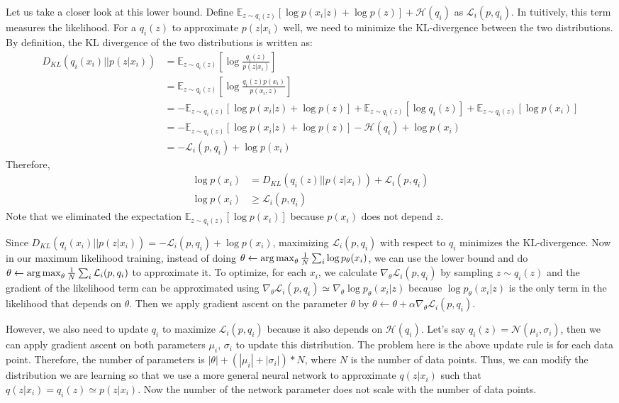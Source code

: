 Let us take a closer look at this lower bound. Define $\mathbb{E}_{z\sim q_i(z)}\left[\log p(x_i|z)+\log p(z)\right] + \mathcal{H}(q_i)$ as $\mathcal{L}_i(p,q_i)$. In tuitively, this term measures the likelihood. For a $q_i(z)$ to approximate $p(z|x_i)$ well, we need to minimize the KL-divergence between the two distributions. By definition, the KL divergence of the two distributions is written as:
\begin{align*}
    D_{KL}(q_i(x_i)||p(z|x_i))&=\mathbb{E}_{z\sim q_i(z)}\left[\log \frac{q_i(z)}{p(z|x_i)}\right]\\
    &=\mathbb{E}_{z\sim q_i(z)}\left[\log \frac{q_i(z)p(x_i)}{p(x_i,z)}\right]\\
    &= -\mathbb{E}_{z\sim q_i(z)}\left[\log p(x_i|z)+\log p(z)\right] + \mathbb{E}_{z\sim q_i(z)}\left[\log q_i(z)\right]+ \mathbb{E}_{z\sim q_i(z)}\left[\log p(x_i)\right]\\
    &= -\mathbb{E}_{z\sim q_i(z)}\left[\log p(x_i|z)+\log p(z)\right] -\mathcal{H}(q_i)+\log p(x_i)\\
    &=-\mathcal{L}_i(p,q_i) + \log p(x_i)
\end{align*}
Therefore,
\begin{align*}
    \log p(x_i) &= D_{KL}(q_i(z)||p(z|x_i)) + \mathcal{L}_i(p,q_i)\\
    \log p(x_i) &\geq \mathcal{L}_i(p,q_i)
\end{align*}
Note that we eliminated the expectation $\mathbb{E}_{z\sim q_i(z)}\left[\log p(x_i)\right]$ because $p(x_i)$ does not depend $z$.

Since $D_{KL}(q_i(x_i)||p(z|x_i)) = -\mathcal{L}_i(p,q_i) + \log p(x_i)$, maximizing $\mathcal{L}_i(p,q_i)$ with respect to $q_i$ minimizes the KL-divergence. Now in our maximum likelihood training, instead of doing $\theta \leftarrow \operatorname*{arg\,max}_\theta \frac{1}{N}\sum_i \log p_\theta(x_i)$, we can use the lower bound and do $\theta \leftarrow \operatorname*{arg\,max}_\theta \frac{1}{N}\sum_i \mathcal{L}_i(p,q_i)$ to approximate it. To optimize, for each $x_i$, we calculate $\nabla_\theta\mathcal{L}_i(p,q_i)$ by sampling $z\sim q_i(z)$ and the gradient of the likelihood term can be approximated using $\nabla_\theta\mathcal{L}_i(p,q_i)\simeq \nabla_\theta\log p_\theta(x_i|z)$ because $\log p_\theta(x_i|z)$ is the only term in the likelihood that depends on $\theta$. Then we apply gradient ascent on the parameter $\theta$ by $\theta \leftarrow \theta + \alpha\nabla_\theta\mathcal{L}_i(p,q_i)$.

However, we also need to update $q_i$ to maximize $\mathcal{L}_i(p,q_i)$ because it also depends on $\mathcal{H}(q_i)$. Let's say $q_i(z) = \mathcal{N}(\mu_i,\sigma_i)$, then we can apply gradient ascent on both parameters $\mu_i$, $\sigma_i$ to update this distribution. The problem here is the above update rule is for each data point. Therefore, the number of parameters is $|\theta| + (|\mu_i| + |\sigma_i|)*N$, where $N$ is the number of data points. Thus, we can modify the distribution we are learning so that we use a more general neural network to approximate $q(z|x_i)$ such that $q(z|x_i) = q_i(z)\simeq p(z|x_i)$. Now the number of the network parameter does not scale with the number of data points. 

